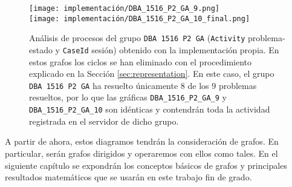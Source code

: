 \begin{figure}[H]
\centering
\texttt{[image: implementación/DBA\_1516\_P2\_GA\_9.png]} \\
\texttt{[image: implementación/DBA\_1516\_P2\_GA\_10\_final.png]}
\caption{Análisis de procesos del grupo \texttt{DBA 1516 P2 GA} (\texttt{Activity} problema-estado y \texttt{CaseId} sesión) obtenido con la implementación propia. En estos grafos los ciclos se han eliminado con el procedimiento explicado en la Sección \ref{sec:representation}. En este caso, el grupo \texttt{DBA 1516 P2 GA} ha resuelto únicamente $8$ de los $9$ problemas resueltos, por lo que las gráficas \texttt{DBA\_1516\_P2\_GA\_9} y \texttt{DBA\_1516\_P2\_GA\_10} son idénticas y contendrán toda la actividad registrada en el servidor de dicho grupo.}
\label{fig:DBA1516P2GA7}
\end{figure}

A partir de ahora, estos diagramos tendrán la consideración de grafos. En particular, serán grafos dirigidos y operaremos con ellos como tales. En el siguiente capítulo se expondrán los conceptos básicos de grafos y principales resultados matemáticos que se usarán en este trabajo fin de grado.